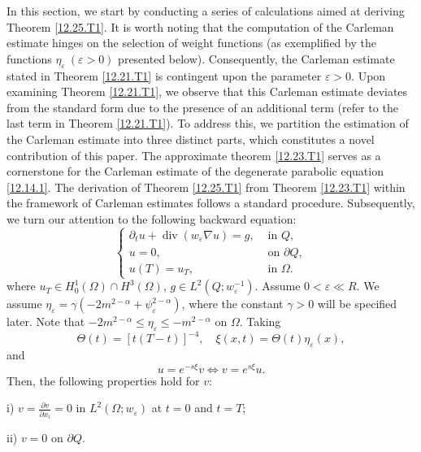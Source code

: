 \documentclass[11pt]{article}
\numberwithin{equation}{section}
\DeclareMathOperator{\Div}{div}
\begin{document}
   In this section, we start  by conducting a series of calculations aimed at deriving Theorem \ref{12.25.T1}. It is worth noting that the computation of the Carleman estimate hinges on the selection of weight functions (as exemplified by the functions $\eta_\varepsilon\ (\varepsilon>0)$ presented below). Consequently, the Carleman estimate stated in Theorem \ref{12.21.T1} is contingent upon the parameter $\varepsilon>0$. Upon examining Theorem \ref{12.21.T1}, we observe that this Carleman estimate deviates from the standard form due to the presence of an additional term (refer to the last term in Theorem \ref{12.21.T1}). To address this, we partition the estimation of the Carleman estimate into three distinct parts, which constitutes a novel contribution of this paper. The approximate theorem \ref{12.23.T1} serves as a cornerstone for the Carleman estimate of the degenerate parabolic equation \eqref{12.14.1}. The derivation of Theorem \ref{12.25.T1} from Theorem \ref{12.23.T1} within the framework of Carleman estimates follows a standard procedure. Subsequently, we turn our attention to the following backward equation:
\begin{equation}\label{12.15.1}
\begin{cases}
\partial_t u + \Div(w_\varepsilon \nabla u) = g, &\text{ in } Q, \\
u = 0, &\text{ on } \partial Q,\\
u(T) = u_T, &\text{ in } \Omega.
\end{cases}
\end{equation}
where $u_T \in H_0^1(\Omega) \cap H^3(\Omega)$, $g \in L^2(Q; w_\varepsilon^{-1})$.
Assume $0 < \varepsilon \ll R$.
We assume $\eta_\varepsilon = \gamma(-2m^{2-\alpha} + \psi_\varepsilon^{2-\alpha})$, where the constant $\gamma > 0$ will be specified later. Note that $-2m^{2-\alpha} \leq \eta_\varepsilon \leq -m^{2-\alpha}$ on $\Omega$.
Taking
\begin{equation*}
\Theta(t) = [t(T-t)]^{-4},   \quad \xi(x,t) = \Theta(t)\eta_\varepsilon(x),
\end{equation*}
and
\begin{equation*}
u = e^{-s\xi}v \Longleftrightarrow v = e^{s\xi}u.
\end{equation*}
Then, the following properties hold for $v$:

i) $v = \frac{\partial v}{\partial x_i} = 0$ in $L^2(\Omega; w_\varepsilon)$ at $t=0$ and $t=T$;

ii) $v = 0$ on $\partial Q$.
\end{document}
